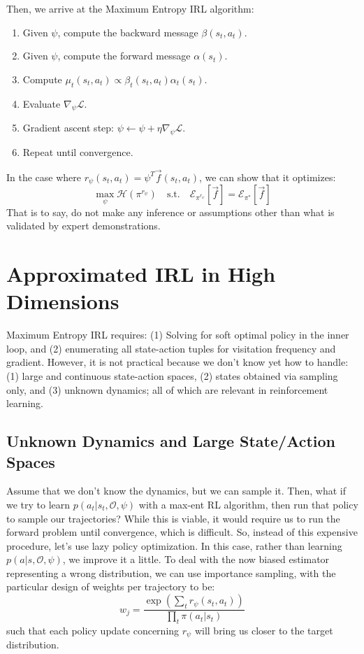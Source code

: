 Then, we arrive at the Maximum Entropy IRL algorithm:
\begin{enumerate}
    \item Given $\psi$, compute the backward message $\beta(s_t, a_t)$.
    \item Given $\psi$, compute the forward message $\alpha(s_t)$.
    \item Compute $\mu_t(s_t, a_t) \propto \beta_t(s_t, a_t) \alpha_t(s_t)$.
    \item Evaluate $\nabla_\psi \mathcal{L}$.
    \item Gradient ascent step: $\psi \leftarrow \psi + \eta \nabla_{\psi} \mathcal{L}$.
    \item Repeat until convergence.
\end{enumerate}
In the case where $r_\psi (s_t, a_t) = \psi^T \vec{f}(s_t, a_t)$, we can show that it optimizes:
\[
    \max_\psi \mathcal{H}(\pi^{r_\psi}) \quad \text{s.t.} \quad \mathcal{E}_{\pi^{r_\psi}} [\vec{f}] = \mathcal{E}_{\pi^*} [\vec{f}]
\]
That is to say, do not make any inference or assumptions other than what is validated by expert demonstrations.

\section{Approximated IRL in High Dimensions}
Maximum Entropy IRL requires: (1) Solving for soft optimal policy in the inner loop, and (2) enumerating all state-action tuples for visitation frequency and gradient.
However, it is not practical because we don't know yet how to handle: (1) large and continuous state-action spaces, (2) states obtained via sampling only, and (3) unknown dynamics; all of which are relevant in reinforcement learning.

\subsection{Unknown Dynamics and Large State/Action Spaces}
Assume that we don't know the dynamics, but we can sample it.
Then, what if we try to learn $p(a_t | s_t, \mathcal{O}, \psi)$ with a max-ent RL algorithm, then run that policy to sample our trajectories?
While this is viable, it would require us to run the forward problem until convergence, which is difficult.
So, instead of this expensive procedure, let's use lazy policy optimization.
In this case, rather than learning $p(a|s, \mathcal{O}, \psi)$, we improve it a little.
To deal with the now biased estimator representing a wrong distribution, we can use importance sampling, with the particular design of weights per trajectory to be:
\[
    w_j = \frac{\exp(\sum_t r_\psi(s_t, a_t))}{\prod_t \pi(a_t|s_t)}
\]
such that each policy update concerning $r_\psi$ will bring us closer to the target distribution.

